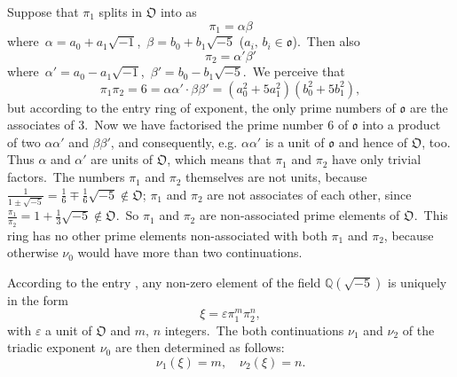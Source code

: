 \documentclass[12pt]{article}
\theoremstyle{definition}
\begin{document}
Suppose that $\pi_1$ splits in $\mathfrak{O}$ into  as
$$\pi_1 = \alpha\beta$$
where\, $\alpha = a_0+a_1\sqrt{-1}$,\, $\beta = b_0+b_1\sqrt{-5}$\; ($a_i,\,b_i \in \mathfrak{o}$).\, Then also
$$\pi_2 = \alpha'\beta'$$
where\, $\alpha' = a_0-a_1\sqrt{-1}$,\, $\beta' = b_0-b_1\sqrt{-5}$.\, We perceive that 
$$\pi_1\pi_2 = 6 = \alpha\alpha' \cdot \beta\beta' = (a_0^2+5a_1^2)(b_0^2+5b_1^2),$$
but according to the entry ring of exponent, the only prime numbers of $\mathfrak{o}$ are the associates of 3.\, Now we have factorised the prime number $6$ of $\mathfrak{o}$ into a product of two  $\alpha\alpha'$ and $\beta\beta'$, and consequently, e.g. $\alpha\alpha'$ is a unit of $\mathfrak{o}$ and hence of $\mathfrak{O}$, too.\, Thus $\alpha$ and $\alpha'$ are units of $\mathfrak{O}$, which means that $\pi_1$ and $\pi_2$ have only trivial factors.\, The numbers $\pi_1$ and $\pi_2$ themselves are not units, because\, $\frac{1}{1\pm\sqrt{-5}} = 
\frac{1}{6}\mp\frac{1}{6}\sqrt{-5} \not\in \mathfrak{O}$; $\pi_1$ and $\pi_2$ are not associates of each other, since\, $\frac{\pi_1}{\pi_2} = 1+\frac{1}{3}\sqrt{-5} \not\in \mathfrak{O}$.\, So $\pi_1$ and $\pi_2$ are non-associated prime elements of $\mathfrak{O}$.\, This ring has no other prime elements non-associated with both $\pi_1$ and $\pi_2$, because otherwise $\nu_0$ would have more than two continuations.

According to the entry , any non-zero element of the field $\mathbb{Q}(\sqrt{-5})$ is uniquely  in the form
                    $$\xi = \varepsilon\pi_1^m\pi_2^n,$$
with $\varepsilon$ a unit of $\mathfrak{O}$ and  $m,\,n$ integers.\, The both continuations $\nu_1$ and $\nu_2$ of the triadic exponent $\nu_0$ are then determined as follows:
                  $$\nu_1(\xi) = m, \quad \nu_2(\xi) = n.$$

\end{document}
